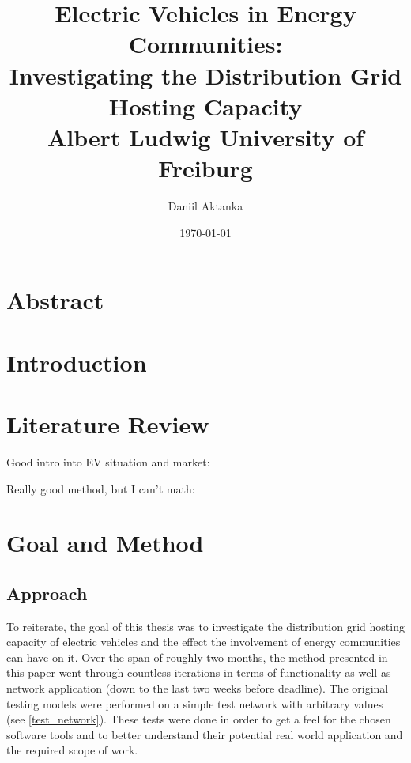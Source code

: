 \documentclass[a4paper,10pt]{report}
\begin{document}
\title{
	\vspace{2cm}
	{\LARGE Electric Vehicles in Energy Communities:}\\
	{\Large Investigating the Distribution Grid Hosting Capacity} \\[2cm]
	{\large Albert Ludwig University of Freiburg}
}
\author{
	\Large Daniil Aktanka
}
\date{
	\normalsize \today
}
\maketitle
\thispagestyle{empty}


\chapter*{Abstract}


\tableofcontents
\cleardoublepage
{}


\chapter{Introduction}
\chapter{Literature Review}\label{section_literature_review}
Good intro into EV situation and market: \cite{Das2020}

Really good method, but I can't math: \cite{Gruosso2019}

\chapter{Goal and Method}
\section{Approach}\label{section_approach}
To reiterate, the goal of this thesis was to investigate the distribution grid hosting capacity of electric vehicles and the effect the involvement of energy communities can have on it. Over the span of roughly two months, the method presented in this paper went through countless iterations in terms of functionality as well as network application (down to the last two weeks before deadline). The original testing models were performed on a simple test network with arbitrary values (see \cref{test_network}). These tests were done in order to get a feel for the chosen software tools and to better understand their potential real world application and the required scope of work.
\end{document}
